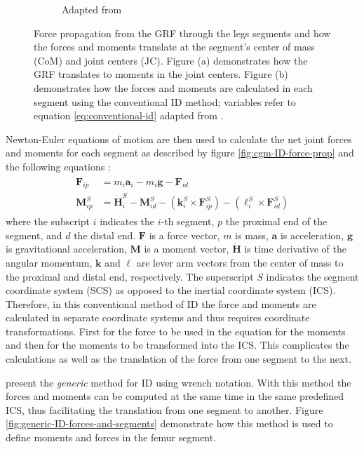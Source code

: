 \documentclass[../main.tex]{subfiles}
\begin{document}
\begin{figure}[!htb]
\begin{subfigure}[t]{0.45\textwidth}
        \caption{Adapted from \cite{Dumas2004}}
        \label{fig:ID-thigh-force-def}
    \end{subfigure}
    \caption{Force propagation from the \ac{GRF} through the legs segments and how the forces and moments translate at the segment's center of mass (CoM) and joint centers (JC). Figure (a) demonstrates how the \ac{GRF} translates to moments in the joint centers. Figure (b) demonstrates how the forces and moments are calculated in each segment using the conventional \ac{ID} method; variables refer to equation \ref{eq:conventional-id} adapted from \cite{Dumas2004}.}
    \label{fig:ID-forces-and-segments}
\end{figure}
Newton-Euler equations of motion are then used to calculate the net joint forces and moments for each segment as described by figure \ref{fig:cgm-ID-force-prop} and the following equations \cite{Dumas2004}:
\begin{align}
\label{eq:conventional-id}
\begin{split}
    \mathbf{F}_{ip} &= m_i\mathbf{a}_i - m_i\mathbf{g} - \mathbf{F}_{id} \\
    \mathbf{M}^S_{ip} &= \Dot{\mathbf{H}}^S_i - \mathbf{M}^S_{id} - (\mathbf{k}_i^S \times \mathbf{F}^S_{ip}) - (\ell^S_i\times\mathbf{F}^S_{id})
\end{split}
\end{align}
where the subscript $i$ indicates the $i$-th segment, $p$ the proximal end of the segment, and $d$ the distal end. $\mathbf{F}$ is a force vector, $m$ is mass, $\mathbf{a}$ is acceleration, $\mathbf{g}$ is gravitational acceleration, $\mathbf{M}$ is a moment vector, $\Dot{\mathbf{H}}$ is time derivative of the angular momentum, $\mathbf{k}$ and $\ell$ are lever arm vectors from the center of mass to the proximal and distal end, respectively.
The superscript $S$ indicates the segment coordinate system (SCS) as opposed to the inertial coordinate system (ICS).
Therefore, in this conventional method of \ac{ID} the force and moments are calculated in separate coordinate systems and thus requires coordinate transformations.
First for the force to be used in the equation for the moments and then for the moments to be transformed into the ICS.
This complicates the calculations as well as the translation of the force from one segment to the next.

\textcite{Dumas2004} present the \textit{generic} method for \ac{ID} using wrench notation.
With this method the forces and moments can be computed at the same time in the same predefined ICS, thus facilitating the translation from one segment to another.
Figure \ref{fig:generic-ID-forces-and-segments} demonstrate how this method is used to define moments and forces in the femur segment.
\end{document}
